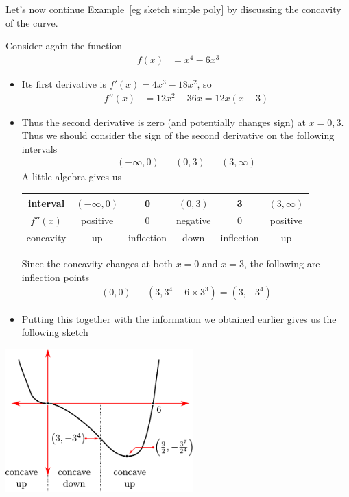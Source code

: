 Let's now continue Example~\ref{eg sketch simple poly} by discussing the
concavity of the
curve.
\begin{eg}
Consider again the function
\begin{align*}
  f(x) &= x^4-6x^3
\end{align*}
\begin{itemize}
 \item Its first derivative is $f'(x)=4x^3-18x^2$, so
\begin{align*}
  f''(x) &= 12x^2 - 36x = 12x(x-3)
\end{align*}
\item Thus the second derivative is zero (and potentially changes sign) at $x=0,3$. Thus
we should consider the sign of the second derivative on the following intervals
\begin{align*}
  (-\infty,0) && (0,3) && (3,\infty)
\end{align*}
A little algebra gives us
\begin{center}
\begin{tabular}{|c|c||c||c||c||c|}
\hline
interval & $(-\infty,0)$ & 0 & $(0,3)$ & 3 & $(3,\infty)$\\
\hline
$f''(x)$ & positive & 0 & negative & 0 & positive \\
\hline
concavity & up & inflection & down & inflection & up
\\
\hline
\end{tabular}
\end{center}
Since the concavity changes at both $x=0$ and $x=3$, the following are inflection points
\begin{align*}
  (0,0) && (3,3^4-6\times3^3)=(3,-3^4)
\end{align*}

\item Putting this together with the information we obtained earlier gives us the
following sketch
\end{itemize}
\begin{efig}
 \begin{center}
  \includegraphics[height=5.5cm]{extra/sketch5}
 \end{center}

\end{efig}

\end{eg}


